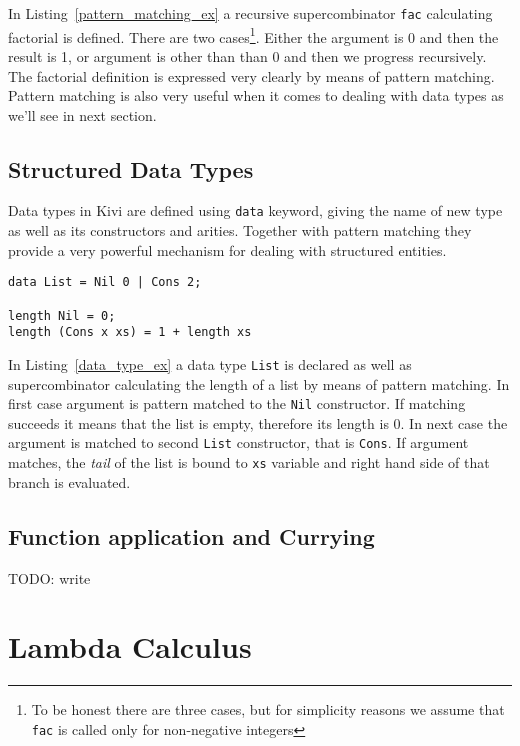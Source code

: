 \documentclass[12pt,a4paper]{report}
\begin{document}
In Listing~\ref{pattern_matching_ex} a recursive supercombinator \texttt{fac}
calculating factorial is defined. There are two cases\footnote{To be honest
there are three cases, but for simplicity reasons we assume that
\texttt{fac} is called only for non-negative integers}. Either the
argument is 0 and then the result is 1, or argument is other than than 0 and
then we progress recursively. The factorial definition is expressed very
clearly by means of pattern matching.
Pattern matching is also very useful when it comes to dealing with data
types as we'll see in next section.

\subsection{Structured Data Types}
Data types in Kivi are defined using \texttt{data} keyword, giving the name of
new type as well as its constructors and arities. Together with pattern matching they
provide a very powerful mechanism for dealing with structured entities.

\hspace*{-1.5in}
\begin{lstlisting}[style=haskell,label=data_type_ex,caption={Calculating length of list.}]
data List = Nil 0 | Cons 2;

length Nil = 0;
length (Cons x xs) = 1 + length xs
\end{lstlisting}

In Listing~\ref{data_type_ex} a data type \texttt{List} is declared as well as
supercombinator calculating the length of a list by means of pattern matching.
In first case argument is pattern matched to the \texttt{Nil} constructor. If
matching succeeds it means that the list is empty, therefore its length is 0.
In next case the argument is matched to second \texttt{List} constructor, that
is \texttt{Cons}. If argument matches, the \textit{tail} of the list is bound to
\texttt{xs} variable and right hand side of that branch is evaluated.

\subsection{Function application and Currying}

TODO: write

\section{Lambda Calculus}
\end{document}
